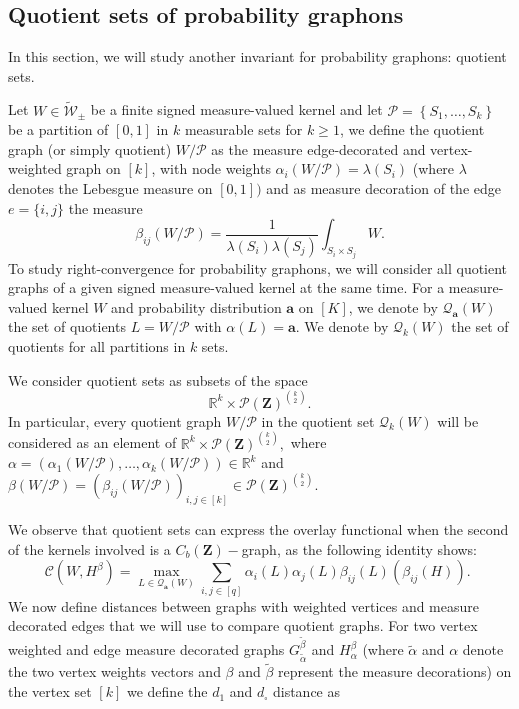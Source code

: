 \documentclass[11pt]{article}
\def\R{\mathbb{R}}
\newcommand{\cP}{{\mathcal P}}  %
\newcommand{\Space}{\mathbf{Z}}
\newcommand{\signed}{\pm}
\newcommand{\CbFunct}{C_b(\Space)}
\newcommand{\UKernel}{\widetilde{\mathcal{W}}_{\signed}}
\begin{document}
\subsection{Quotient sets of probability graphons}

In this section, we will study another invariant for probability graphons: quotient sets.

Let $W\in\UKernel$ be a finite signed measure-valued kernel and let $\mathcal{P}=\left\{S_1, \ldots, S_k\right\}$ be a partition of $[0,1]$ in $k$ measurable sets for $k\geq 1$, we define the quotient graph (or simply quotient) $W / \mathcal{P}$  as the measure edge-decorated and vertex-weighted graph on $[k]$, with node weights $\alpha_i(W / \mathcal{P})=\lambda\left(S_i\right)$ (where $\lambda$ denotes the Lebesgue measure on $[0,1])$ and as measure decoration of the edge $e=\{i,j\}$ the measure
$$
\beta_{i j}(W / \mathcal{P})=\frac{1}{\lambda\left(S_i\right) \lambda\left(S_j\right)} \int_{S_i \times S_j} W .
$$
To study right-convergence for probability graphons, we will consider all quotient graphs of a given signed measure-valued kernel at the same time. For a measure-valued kernel $W$ and probability distribution $\mathbf{a}$ on $[K]$, we denote by $\mathcal{Q}_{\mathbf{a}}(W)$ the set of quotients $L=W / \mathcal{P}$ with $\alpha(L)=\mathbf{a}.$ We denote by $\mathcal{Q}_k(W)$ the set of quotients for all partitions in $k$ sets.

We consider quotient sets as subsets of the space $$\R^k\times\cP(\Space)^{{k} \choose {2}}.$$
In particular, every quotient graph $W / \mathcal{P}$ in the quotient set $\mathcal{Q}_k(W)$ will be considered as an element of $\R^k\times\cP(\Space)^{{k} \choose {2}},$ where $\alpha=(\alpha_1(W / \mathcal{P}),\ldots,\alpha_k(W / \mathcal{P}))\in \R^k$ and $\beta(W / \mathcal{P})=(\beta_{i j}(W / \mathcal{P}))_{i,j\in [k]}\in \cP(\Space)^{{k} \choose {2}}.$

We observe that quotient sets can express the overlay functional when the second of the kernels involved is a $\CbFunct-$graph, as the following identity shows: 
\begin{equation}\label{OverlayQuotient}
    \mathcal{C}(W, H^{\beta})=\max _{L \in \mathcal{Q}_{\mathbf{a}}(W)} \sum_{i, j \in[q]} \alpha_i(L) \alpha_j(L) \beta_{i j}(L) (\beta_{i j}(H) )\text {. }
\end{equation}
We now define distances between graphs with weighted vertices and measure decorated edges that we will use to compare quotient graphs. 
For two vertex weighted and edge measure decorated graphs $G_{\tilde{\alpha}}^{\tilde{\beta}}$ and $H_{\alpha}^{\beta}$ (where $\tilde \alpha $ and $\alpha$ denote the two vertex weights vectors and $\beta$ and $\tilde\beta$ represent the measure decorations) on the vertex set $[k]$ we define the $d_1$ and $d_{\square}$ distance as 
\end{document}
